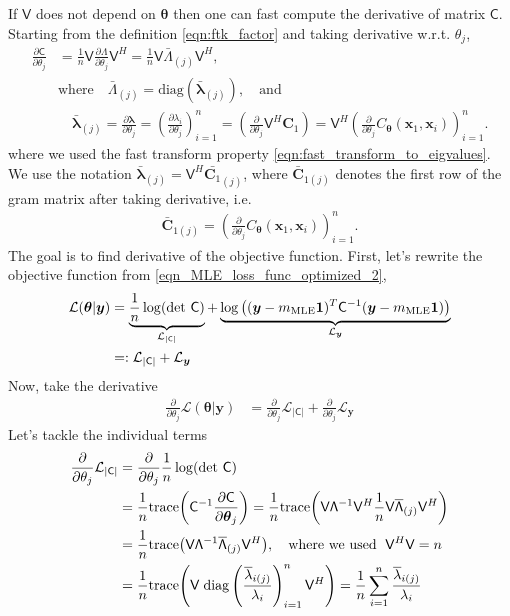 \documentclass{iitthesis}          %
\newcommand{\bm}[1]{\boldsymbol{#1}}
\newcommand{\trace}[1]{\textup{trace}{#1}}
\newcommand{\vlambda}{{\bm{\lambda}}}
\newcommand{\vtheta}{{\bm{\theta}}}
\newcommand{\vC}{\bm{C}}
\newcommand{\vx}{\bm{x}}
\newcommand{\vy}{\bm{y}}
\newcommand{\vone}{\bm{1}}
\newcommand{\mC}{\mathsf{C}}
\newcommand{\mCInv}{{\mathsf{C}^{-1}}}
\newcommand{\mLambda}{\mathsf{\Lambda}}
\newcommand{\mV}{\mathsf{V}}
\newcommand{\MLE}{\textup{MLE}}
\newcommand{\diag}{\text{diag}}
\def\abs#1{\ensuremath{\left \lvert #1 \right \rvert}}
\begin{document}
 \label{deriv_obj_func_MLE} 
If $\mV$ does not depend on $\vtheta$ then one can fast compute the derivative of matrix $\mC$. Starting from the definition \eqref{eqn:ftk_factor} and taking derivative w.r.t. $\theta_j$, 
\begin{align*}
\displaystyle \frac{\partial \mC}{\partial \theta_j} 
& = \frac 1n \mV \frac{\partial {\mLambda}}{\partial \theta_j} \mV^H
= \frac 1n \mV \bar{\mLambda}_{(j)} \mV^H,
\\
& \text{where} \quad \bar{\mLambda}_{(j)} = \diag(\bar{\vlambda}_{(j)}), \quad \text{and}
\\
&  \quad \bar{\vlambda}_{(j)} = \frac{\partial \vlambda}{\partial \theta_j} = \left( \frac{\partial \lambda_i}{\partial \theta_j} \right)_{i=1}^n 
 = \left( \frac{\partial }{\partial \theta_j} \mV^H {\vC_1} \right)
 = \mV^H \left( \frac{\partial }{\partial \theta_j} {C_\vtheta(\vx_1,\vx_i)} \right)_{i=1}^n.
\end{align*}
where we used the fast transform property \eqref{eqn:fast_transform_to_eigvalues}.
We use the notation $\bar{\vlambda}_{(j)} = \mV^H \bar{\vC_1}_{(j)}$,  where $\bar{\vC}_{1(j)}$ denotes the first row of the gram matrix after taking derivative, i.e.
\begin{align*}
\bar{\vC}_{1{(j)}} = \left(\frac{\partial }{\partial{\theta}_j} C_\vtheta(\vx_1,\vx_i) \right)_{i=1}^n.
\end{align*}
The goal is to find derivative of the objective function. First, let's rewrite the objective function from \eqref{eqn_MLE_loss_func_optimized_2},
\begin{align*}
\mathcal{L}(\vtheta | \vy) &= 
\underbrace{\frac{1}{n}  \log(\det\, \mC)}_{\mathcal{L}_{\abs{\mC}}} + \underbrace{\log\left((\vy-m_\MLE\vone)^T\mCInv(\vy-m_\MLE\vone) \right)}_{\mathcal{L}_{\vy}}
\\ &=: \mathcal{L}_{\abs{\mC}} + \mathcal{L}_{\vy}
\end{align*}
Now, take the derivative
\begin{align*}
\frac{\partial}{\partial \theta_j} \mathcal{L}(\vtheta | \vy)
&=  \frac{\partial}{\partial \theta_j} \mathcal{L}_{\abs{\mC}} + \frac{\partial}{\partial \theta_j} \mathcal{L}_{\vy}
\end{align*}
Let's tackle the individual terms
\begin{align*}
\frac{\partial}{\partial \theta_j} \mathcal{L}_{\abs{\mC}} &= \frac{\partial}{\partial \theta_j}  \frac{1}{n} \log(\det\, \mC) 
\\ & = \frac 1n \trace{\left( \mCInv \frac{\partial \mC}{\partial \vtheta_j} \right)}
 = \frac{1}{n}
\trace{\left( \mV {\mLambda}^{-1} \mV^H
\frac 1n \mV \overline{\mLambda}_{(j)} \mV^H
\right)}
\\
& = \frac{1}{n}
\trace{\left(
	 \mV {\mLambda}^{-1}  \overline{\mLambda}_{(j)} \mV^H
	\right)}, \quad \text{where we used } \; \mV^H \mV = n
\\
& =\frac{1}{n}
\trace{\left(
	 \mV \;
	\diag\left( \frac{\overline{\lambda}_{i(j)}}{\lambda_i} \right)_{i=1}^n \mV^H
	\right)}
= \frac{1}{n} \sum_{i=1}^{n} \frac{\overline{\lambda}_{i(j)}}{\lambda_i}
\end{align*}
\end{document}
